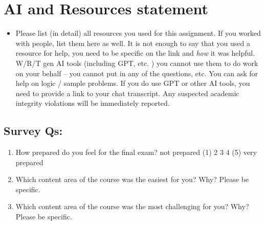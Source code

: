 \documentclass[
]{article}
\providecommand{\tightlist}{%
  \setlength{\itemsep}{0pt}\setlength{\parskip}{0pt}}
\begin{document}
\section{AI and Resources statement}\label{ai-and-resources-statement}

\begin{itemize}
\tightlist
\item
  Please list (in detail) all resources you used for this assignment. If
  you worked with people, list them here as well. It is not enough to
  say that you used a resource for help, you need to be specific on the
  link and \emph{how} it was helpful. W/R/T gen AI tools (including GPT,
  etc. ) you cannot use them to do work on your behalf -- you cannot put
  in any of the questions, etc. You can ask for help on logic / sample
  problems. If you do use GPT or other AI tools, you need to provide a
  link to your chat transcript. Any suspected academic integrity
  violations will be immediately reported.
\end{itemize}

\subsection{Survey Qs:}\label{survey-qs}

\begin{enumerate}
\def\labelenumi{\arabic{enumi}.}
\item
  How prepared do you feel for the final exam? not prepared (1) 2 3 4
  (5) very prepared
\item
  Which content area of the course was the easiest for you? Why? Please
  be specific.
\item
  Which content area of the course was the most challenging for you?
  Why? Please be specific.
\end{enumerate}
\end{document}
